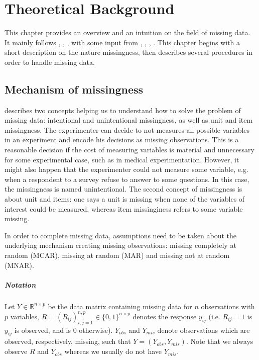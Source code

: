 \chapter{Theoretical Background}

This chapter provides an overview and an intuition on the field of missing
data. It mainly follows \cite{schafer2002missing},
\cite{little2002statistical}, \cite{van2012flexible}, with some input from
\cite{wikipediaImputation2015}, \cite{matloffblog2015}, \cite{gelman2006data},
\cite{troyanskaya2001missing}. This chapter begins with a short description on
the nature missingness, then describes several procedures in order to handle
missing data.

\section{Mechanism of missingness}
\label{sec:source-missingness}

\cite{van2012flexible} describes two concepts helping us to understand how to
solve the problem of missing data: intentional and unintentional missingness,
as well as unit and item missingness. The experimenter can decide to not
measures all possible variables in an experiment and encode his decisions as
missing observations. This is a reasonable decision if the cost of measuring
variables is material and unnecessary for some experimental case, such as in
medical experimentation. However, it might also happen that the experimenter
could not measure some variable, e.g. when a respondent to a survey refuse to
answer to some questions. In this case, the missingness is named
unintentional. The second concept of missingness is about unit and items: one
says a unit is missing when none of the variables of interest could be
measured, whereas item missinginess refers to some variable missing.

In order to complete missing data, assumptions need to be taken about the
underlying mechanism creating missing observations: missing completely at
random (MCAR), missing at random (MAR) and missing not at random (MNAR).

\paragraph{Notation}

Let $Y \in \mathbb{R}^{n\times p}$ be the data matrix containing missing data
for $n$ observations with $p$ variables,
$R = (R_{ij})_{i,j=1}^{n,p} \in \{0, 1\}^{n\times p}$ denotes the response
$y_{ij}$ (i.e. $R_{ij} = 1$ is $y_{ij}$ is observed, and is $0$
otherwise). $Y_{obs}$ and $Y_{mis}$ denote observations which are observed,
respectively, missing, such that $Y=(Y_{obs}, Y_{mis})$. Note that we always
observe $R$ and $Y_{obs}$ whereas we usually do not have $Y_{mis}$.

